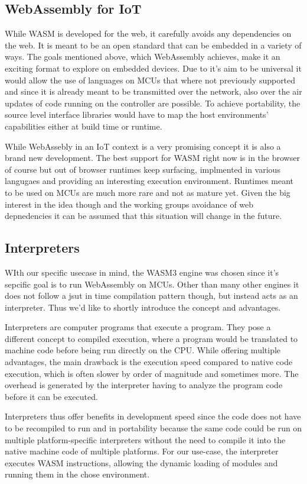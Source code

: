 \subsection{WebAssembly for IoT}
While WASM is developed for the web, it carefully avoids any dependencies on the web. It is meant to be an open standard that can be embedded in a variety of ways. The goals mentioned above, which WebAssembly achieves, make it an exciting format to explore on embedded devices. Due to it's aim to be universal it would allow the use of languages on MCUs that where not previously supported and since it is already meant to be transmitted over the network, also over the air updates of code running on the controller are possible. To achieve portability, the source level interface libraries would have to map the host environments' capabilities either at build time or runtime.

While WebAssebly in an IoT context is a very promising concept it is also a brand new development. The best support for WASM right now is in the browser of course but out of browser runtimes keep surfacing, implmented in various langugaes and providing an interesting execution environment. Runtimes meant to be used on MCUs are much more rare and not as mature yet. Given the big interest in the idea though and the working groups avoidance of web depnedencies it can be assumed that this situation will change in the future.
\subsection{Interpreters}
WIth our specific usecase in mind, the WASM3 engine was chosen since it's sepcific goal is to run WebAssembly on MCUs. Other than many other engines it does not follow a jsut in time compilation pattern though, but instead acts as an interpreter. Thus we'd like to shortly introduce the concept and advantages.

Interpreters are computer programs that execute a program. They pose a different concept to compiled execution, where a program would be translated to machine code before being run directly on the CPU. While offering multiple advantages, the main drawback is the execution speed compared to native code execution, which is often slower by order of magnitude and sometimes more. The overhead is generated by the interpreter having to analyze the program code before it can be executed.

Interpreters thus offer benefits in development speed since the code does not have to be recompiled to run and in portability because the same code could be run on multiple platform-specific interpreters without the need to compile it into the native machine code of multiple platforms. For our use-case, the interpreter executes WASM instructions, allowing the dynamic loading of modules and running them in the chose environment.
